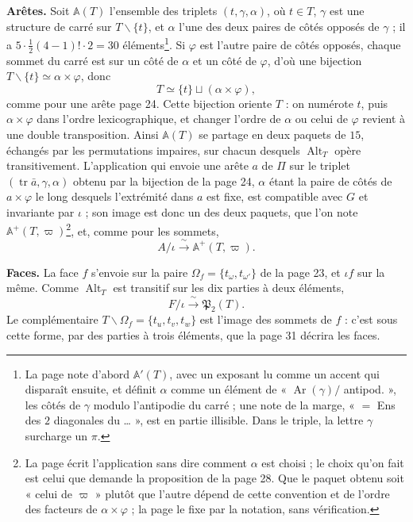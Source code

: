 \documentclass[11pt,a4paper]{article}
\begin{document}
\textbf{Arêtes.} Soit $\mathbb{A}(T)$ l'ensemble des triplets $(t, \gamma,
\alpha)$, où $t \in T$, $\gamma$ est une structure de carré sur $T
\smallsetminus \{t\}$, et $\alpha$ l'une des deux paires de côtés opposés de
$\gamma$ ; il a $5 \cdot \frac12 (4-1)! \cdot 2 = 30$ éléments\footnote{La page
note d'abord $\mathbb{A}'(T)$, avec un exposant lu comme un accent qui disparaît
ensuite, et définit $\alpha$ comme un élément de « $\operatorname{Ar}(\gamma)/$
antipod. », les côtés de $\gamma$ modulo l'antipodie du carré ; une note de la
marge, « $=$ Ens des $2$ diagonales du … », est en partie illisible. Dans le
triple, la lettre $\gamma$ surcharge un $\pi$.}. Si $\varphi$ est l'autre
paire de côtés opposés, chaque sommet du carré est sur un côté de $\alpha$ et un
côté de $\varphi$, d'où une bijection $T \smallsetminus \{t\} \simeq \alpha
\times \varphi$, donc
\[
T \simeq \{t\} \sqcup (\alpha \times \varphi),
\]
comme pour une arête page 24. Cette bijection oriente $T$ : on numérote $t$,
puis $\alpha \times \varphi$ dans l'ordre lexicographique, et changer l'ordre
de $\alpha$ ou celui de $\varphi$ revient à une double transposition. Ainsi
$\mathbb{A}(T)$ se partage en deux paquets de $15$, échangés par les
permutations impaires, sur chacun desquels $\operatorname{Alt}_T$ opère
transitivement. L'application qui envoie une arête $a$ de $\Pi$ sur le
triplet $(\operatorname{tr}\bar a, \gamma, \alpha)$ obtenu par la bijection de
la page 24, $\alpha$ étant la paire de côtés de $a \times \varphi$ le long
desquels l'extrémité dans $a$ est fixe, est compatible avec $G$ et invariante
par $\iota$ ; son image est donc un des deux paquets, que l'on note
$\mathbb{A}^{+}(T, \varpi)$\footnote{La page écrit l'application sans dire comment $\alpha$ est choisi ;
le choix qu'on fait est celui que demande la proposition de la page 28. Que le
paquet obtenu soit « celui de $\varpi$ » plutôt que l'autre dépend de cette
convention et de l'ordre des facteurs de $\alpha \times \varphi$ ; la page le
fixe par la notation, sans vérification.}, et, comme pour les sommets,
\[
A/\iota \xrightarrow{\ \sim\ } \mathbb{A}^{+}(T, \varpi).
\]

\textbf{Faces.} La face $f$ s'envoie sur la paire $\Omega_f = \{t_\omega,
t_{\omega'}\}$ de la page 23, et $\iota f$ sur la même. Comme
$\operatorname{Alt}_T$ est transitif sur les dix parties à deux éléments,
\[
F/\iota \xrightarrow{\ \sim\ } \mathfrak{P}_2(T).
\]
Le complémentaire $T \smallsetminus \Omega_f = \{t_u, t_v, t_w\}$ est l'image
des sommets de $f$ : c'est sous cette forme, par des parties à trois éléments,
que la page 31 décrira les faces.
\end{document}
